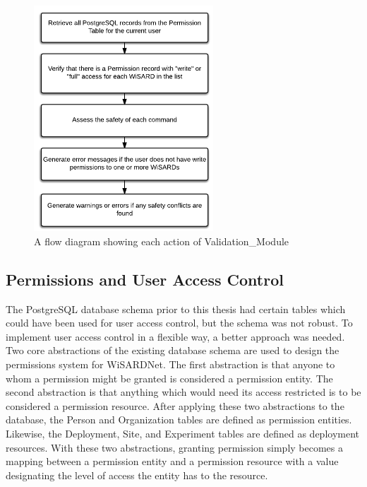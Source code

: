 \begin{figure}[H]
	\centering
	\includegraphics[width=0.6\textwidth]{figures/flow_diagram_validation_module.png}
	\caption{A flow diagram showing each action of Validation\_Module}
	\label{fig:flow_validation_module}
\end{figure}

\subsection{Permissions and User Access Control}
The PostgreSQL database schema prior to this thesis had certain tables which could have been used for user access control, but the schema was not robust. To implement user access control in a flexible way, a better approach was needed. Two core abstractions of the existing database schema are used to design the permissions system for WiSARDNet. The first abstraction is that anyone to whom a permission might be granted is considered a permission entity. The second abstraction is that anything which would need its access restricted is to be considered a permission resource. After applying these two abstractions to the database, the Person and Organization tables are defined as permission entities. Likewise, the Deployment, Site, and Experiment tables are defined as deployment resources. With these two abstractions, granting permission simply becomes a mapping between a permission entity and a permission resource with a value designating the level of access the entity has to the resource.

